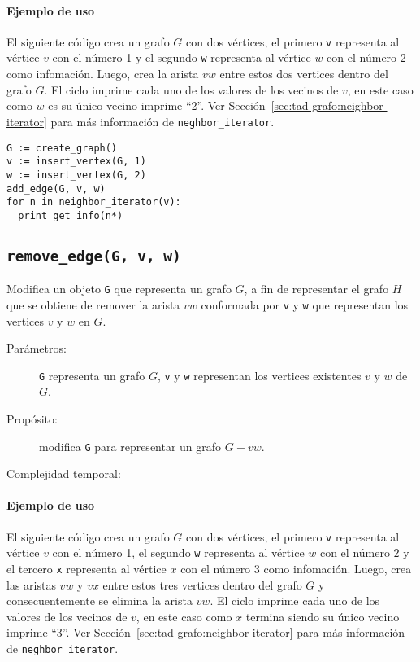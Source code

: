 \documentclass[a4paper,12pt]{article}
\begin{document}
\paragraph{Ejemplo de uso}

El siguiente código crea un grafo $G$ con dos vértices, el primero \texttt{v} representa al vértice $v$ con el número 1 y el segundo \texttt{w} representa al vértice $w$ con el número 2 como infomación. Luego, crea la arista $vw$ entre estos dos vertices dentro del grafo $G$. El ciclo imprime cada uno de los valores de los vecinos de $v$, en este caso como $w$ es su único vecino imprime ``2''. Ver Sección~\ref{sec:tad grafo:neighbor-iterator} para más información de \texttt{neghbor\_iterator}.

\begin{lstlisting}
G := create_graph()
v := insert_vertex(G, 1)
w := insert_vertex(G, 2)
add_edge(G, v, w)
for n in neighbor_iterator(v):
  print get_info(n*)
\end{lstlisting}


\subsection{\texttt{remove\_edge(G, v, w)}}
\label{sec:tad grafo:remove-edge}

Modifica un objeto \texttt{G} que representa un grafo $G$, a fin de representar el grafo $H$ que se obtiene de remover la arista $vw$ conformada por \texttt{v} y \texttt{w} que representan los vertices $v$ y $w$ en $G$.

\begin{description}
  \item [Parámetros:] \texttt{G} representa un grafo $G$, \texttt{v} y \texttt{w} representan los vertices existentes $v$ y $w$ de $G$.
  \item [Propósito:] modifica \texttt{G} para representar un grafo $G - vw$.
  \item [Complejidad temporal:]
\end{description}

\paragraph{Ejemplo de uso}

El siguiente código crea un grafo $G$ con dos vértices, el primero \texttt{v} representa al vértice $v$ con el número 1, el segundo \texttt{w} representa al vértice $w$ con el número 2 y el tercero \texttt{x} representa al vértice $x$ con el número 3 como infomación. Luego, crea las aristas $vw$ y $vx$ entre estos tres vertices dentro del grafo $G$ y consecuentemente se elimina la arista $vw$. El ciclo imprime cada uno de los valores de los vecinos de $v$, en este caso como $x$ termina siendo su único vecino imprime ``3''. Ver Sección~\ref{sec:tad grafo:neighbor-iterator} para más información de \texttt{neghbor\_iterator}.
\end{document}
